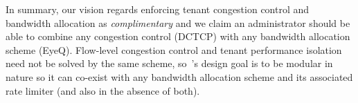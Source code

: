 In summary, our vision regards enforcing tenant congestion control and bandwidth allocation as {\em complimentary} and we claim 
an administrator should be able to
combine any congestion control (\eg{}DCTCP) with any bandwidth allocation scheme (\eg{}EyeQ). 
Flow-level congestion control and tenant performance isolation need not be solved by the same scheme,
so~\acdc{}'s design goal is to be modular in nature so it can co-exist with any bandwidth allocation scheme
and its associated rate limiter (and also in the absence of both). 

%
